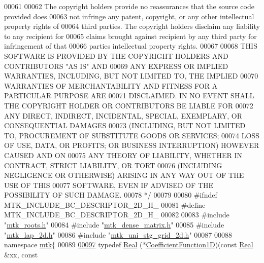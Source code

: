 \begin{DoxyCode}
00061 \textcolor{comment}{}
00062 \textcolor{comment}{The copyright holders provide no reassurances that the source code provided does}
00063 \textcolor{comment}{not infringe any patent, copyright, or any other intellectual property rights of}
00064 \textcolor{comment}{third parties. The copyright holders disclaim any liability to any recipient for}
00065 \textcolor{comment}{claims brought against recipient by any third party for infringement of that}
00066 \textcolor{comment}{parties intellectual property rights.}
00067 \textcolor{comment}{}
00068 \textcolor{comment}{THIS SOFTWARE IS PROVIDED BY THE COPYRIGHT HOLDERS AND CONTRIBUTORS "AS IS" AND}
00069 \textcolor{comment}{ANY EXPRESS OR IMPLIED WARRANTIES, INCLUDING, BUT NOT LIMITED TO, THE IMPLIED}
00070 \textcolor{comment}{WARRANTIES OF MERCHANTABILITY AND FITNESS FOR A PARTICULAR PURPOSE ARE}
00071 \textcolor{comment}{DISCLAIMED. IN NO EVENT SHALL THE COPYRIGHT HOLDER OR CONTRIBUTORS BE LIABLE FOR}
00072 \textcolor{comment}{ANY DIRECT, INDIRECT, INCIDENTAL, SPECIAL, EXEMPLARY, OR CONSEQUENTIAL DAMAGES}
00073 \textcolor{comment}{(INCLUDING, BUT NOT LIMITED TO, PROCUREMENT OF SUBSTITUTE GOODS OR SERVICES;}
00074 \textcolor{comment}{LOSS OF USE, DATA, OR PROFITS; OR BUSINESS INTERRUPTION) HOWEVER CAUSED AND ON}
00075 \textcolor{comment}{ANY THEORY OF LIABILITY, WHETHER IN CONTRACT, STRICT LIABILITY, OR TORT}
00076 \textcolor{comment}{(INCLUDING NEGLIGENCE OR OTHERWISE) ARISING IN ANY WAY OUT OF THE USE OF THIS}
00077 \textcolor{comment}{SOFTWARE, EVEN IF ADVISED OF THE POSSIBILITY OF SUCH DAMAGE.}
00078 \textcolor{comment}{*/}
00079 
00080 \textcolor{preprocessor}{#ifndef MTK\_INCLUDE\_BC\_DESCRIPTOR\_2D\_H\_}
00081 \textcolor{preprocessor}{#define MTK\_INCLUDE\_BC\_DESCRIPTOR\_2D\_H\_}
00082 
00083 \textcolor{preprocessor}{#include "\hyperlink{mtk__roots_8h}{mtk\_roots.h}"}
00084 \textcolor{preprocessor}{#include "\hyperlink{mtk__dense__matrix_8h}{mtk\_dense\_matrix.h}"}
00085 \textcolor{preprocessor}{#include "\hyperlink{mtk__lap__2d_8h}{mtk\_lap\_2d.h}"}
00086 \textcolor{preprocessor}{#include "\hyperlink{mtk__uni__stg__grid__2d_8h}{mtk\_uni\_stg\_grid\_2d.h}"}
00087 
00088 \textcolor{keyword}{namespace }\hyperlink{namespacemtk}{mtk}\{
00089 
\hypertarget{mtk__robin__bc__descriptor__2d_8h_source_l00097}{}\hyperlink{group__c07-mim__ops_gaa79593eeb6676d6011db339e01983909}{00097} \textcolor{keyword}{typedef} \hyperlink{group__c01-roots_gac080bbbf5cbb5502c9f00405f894857d}{Real} (*\hyperlink{group__c07-mim__ops_gaa79593eeb6676d6011db339e01983909}{CoefficientFunction1D})(\textcolor{keyword}{const} \hyperlink{group__c01-roots_gac080bbbf5cbb5502c9f00405f894857d}{Real} &xx, \textcolor{keyword}{const} 

\end{DoxyCode}
